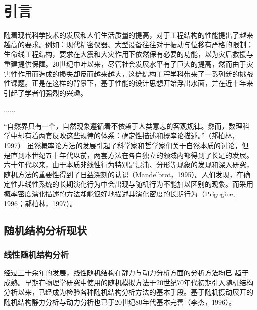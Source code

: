 \chapter{引言}
\label{chap:introduction}
随着现代科学技术的发展和人们生活质量的提高，对于工程结构的性能提出了越来越高的要求。例如：现代精密仪器、大型设备往往对于振动与位移有严格的限制；生命线工程结构，要求在大震和大灾作用下依然保有必要的功能，以为灾后救援与重建提供保障。20世纪中叶以来，尽管社会发展水平有了巨大的提高，然而由于灾害性作用而造成的损失却反而越来越大，这给结构工程学科带来了一系列新的挑战性课题。正是在这样的背景下，基于性能的设计思想开始浮出水面，并在近十年来引起了学者们强烈的兴趣。

......

“自然界只有一个，自然现象遵循着不依赖于人类意志的客观规律。然而，数理科学中却有着两套反映这些规律的体系：确定性描述和概率论描述。”（郝柏林，1997） 虽然概率论方法的发展引起了科学家和哲学家们关于自然本质的讨论，但是直到本世纪五十年代以前，两套方法在各自独立的领域内都得到了长足的发展。六十年代以来，由于本质非线性行为特别是混沌、分形等现象的发现和深入研究，随机方法的重要性得到了日益深刻的认识（Mandelbrot，1995）。人们发现，在确定性非线性系统的长期演化行为中会出现与随机行为不能加以区别的现象。而采用概率密度演化描述的方法却能很好地描述其演化密度的长期行为（Prigogine, 1996；郝柏林，1997）。
\section{随机结构分析现状}

\subsection{线性随机结构分析}
经过三十余年的发展，线性随机结构在静力与动力分析方面的分析方法均已
趋于成熟。早期在物理学研究中使用的随机模拟方法于20世纪70年代初期引入随机结构分析以来，已经成为检验各种随机结构分析方法的基本手段。基于随机摄动展开的随机结构静力分析与动力分析也已于20世纪80年代基本完善（李杰，1996）。